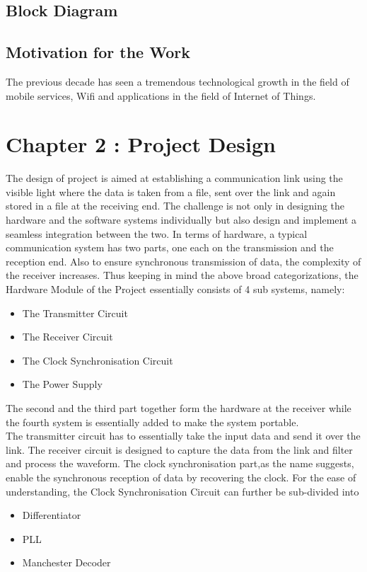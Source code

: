 \documentclass{article}
\begin{document}
\subsection{Block Diagram}

\subsection{Motivation for the Work}
The previous decade has seen a tremendous technological growth in the field of mobile services, Wifi and applications in the field of Internet of Things. 
\section{Chapter 2 : Project Design}
The design of project is aimed at establishing a communication link using the visible light where the data is taken from a file, sent over the link and again stored in a file at the receiving end. The challenge is not only in designing the hardware and the software systems individually but also design and implement a seamless integration between the two. In terms of hardware, a typical communication system has two parts, one each on the transmission and the reception end. Also to ensure synchronous transmission of data, the complexity of the receiver increases. Thus keeping in mind the above broad categorizations, the Hardware Module of the Project essentially consists of 4 sub systems, namely:
\begin{itemize}
\item The Transmitter Circuit
\item The Receiver Circuit
\item The Clock Synchronisation Circuit
\item The Power Supply
\end{itemize}

The second and the third part together form the hardware at the receiver while the fourth system is essentially added to make the system portable.\\
The transmitter circuit has to essentially take the input data and send it over the link. The receiver circuit is designed to capture the data from the link and filter and process the waveform. The clock synchronisation part,as the name suggests, enable the synchronous reception of data by recovering the clock. For the ease of understanding, the Clock Synchronisation Circuit can further be sub-divided into
\begin{itemize}
\item Differentiator
\item PLL
\item Manchester Decoder
\end{itemize}
\end{document}
